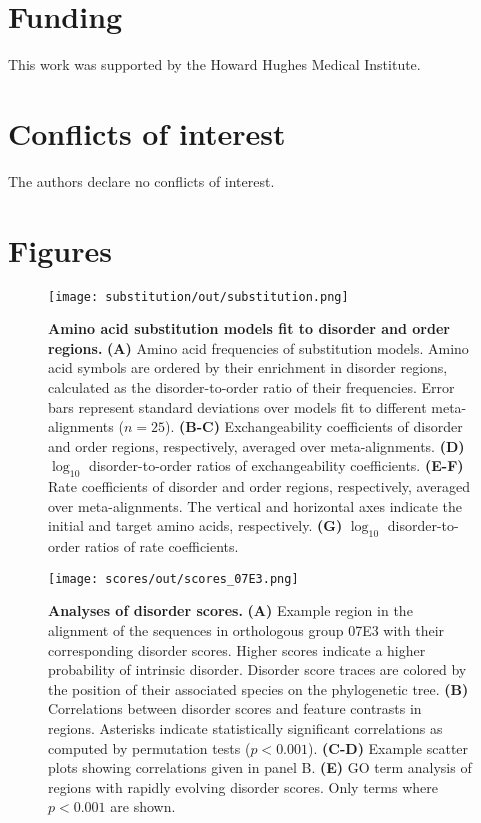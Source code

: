 \section{Funding}
This work was supported by the Howard Hughes Medical Institute.

\section{Conflicts of interest}
The authors declare no conflicts of interest.

\clearpage
\printbibliography

\clearpage
\section*{Figures}

\begin{figure}[h!]
\texttt{[image: substitution/out/substitution.png]}
\centering
\caption{\textbf{Amino acid substitution models fit to disorder and order regions.}
\textbf{(A)} Amino acid frequencies of substitution models. Amino acid symbols are ordered by their enrichment in disorder regions, calculated as the disorder-to-order ratio of their frequencies. Error bars represent standard deviations over models fit to different meta-alignments ($n = 25$). \textbf{(B-C)} Exchangeability coefficients of disorder and order regions, respectively, averaged over meta-alignments. \textbf{(D)} $\log_{10}$ disorder-to-order ratios of exchangeability coefficients. \textbf{(E-F)} Rate coefficients of disorder and order regions, respectively, averaged over meta-alignments. The vertical and horizontal axes indicate the initial and target amino acids, respectively. \textbf{(G)} $\log_{10}$ disorder-to-order ratios of rate coefficients.}
\label{fig:substitution}
\end{figure}

\begin{figure}[h!]
\texttt{[image: scores/out/scores\_07E3.png]}
\centering
\caption{\textbf{Analyses of disorder scores.}
\textbf{(A)} Example region in the alignment of the sequences in orthologous group 07E3 with their corresponding disorder scores. Higher scores indicate a higher probability of intrinsic disorder. Disorder score traces are colored by the position of their associated species on the phylogenetic tree. \textbf{(B)} Correlations between disorder scores and feature contrasts in regions. Asterisks indicate statistically significant correlations as computed by permutation tests ($p < 0.001$). \textbf{(C-D)} Example scatter plots showing correlations given in panel B. \textbf{(E)} GO term analysis of regions with rapidly evolving disorder scores. Only terms where $p < 0.001$ are shown.}
\label{fig:scores}
\end{figure}

